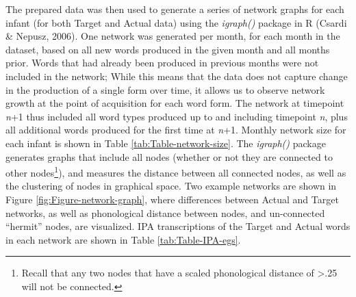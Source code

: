 \documentclass[
  man]{apa6}
\begin{document}
The prepared data was then used to generate a series of network graphs for each infant (for both Target and Actual data) using the \emph{igraph()} package in R (Csardi \& Nepusz, 2006). One network was generated per month, for each month in the dataset, based on all new words produced in the given month and all months prior. Words that had already been produced in previous months were not included in the network; While this means that the data does not capture change in the production of a single form over time, it allows us to observe network growth at the point of acquisition for each word form. The network at timepoint \emph{n}+1 thus included all word types produced up to and including timepoint \emph{n}, plus all additional words produced for the first time at \emph{n}+1. Monthly network size for each infant is shown in Table \ref{tab:Table-network-size}. The \emph{igraph()} package generates graphs that include all nodes (whether or not they are connected to other nodes\footnote{Recall that any two nodes that have a scaled phonological distance of \textgreater.25 will not be connected.}), and measures the distance between all connected nodes, as well as the clustering of nodes in graphical space. Two example networks are shown in Figure \ref{fig:Figure-network-graph}, where differences between Actual and Target networks, as well as phonological distance between nodes, and un-connected ``hermit'' nodes, are visualized. IPA transcriptions of the Target and Actual words in each network are shown in Table \ref{tab:Table-IPA-egs}.
\end{document}

